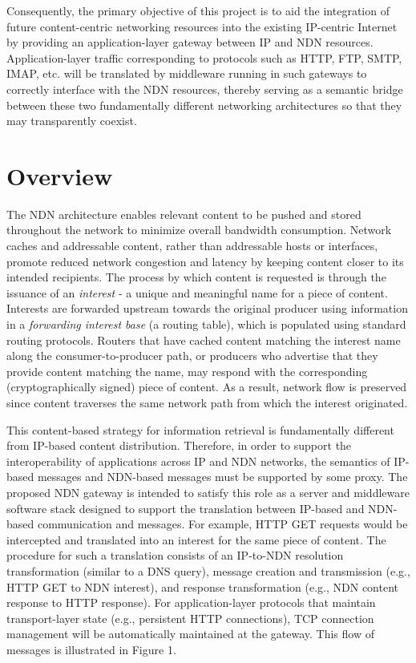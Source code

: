 \documentclass[10pt]{article}
\begin{document}
Consequently, the primary objective of this project is to aid the integration of future content-centric networking resources into the existing IP-centric Internet by providing an application-layer gateway between IP and NDN resources. Application-layer traffic corresponding to protocols such as HTTP, FTP, SMTP, IMAP, etc. will be translated by middleware running in such gateways to correctly interface with the NDN resources, thereby serving as a semantic bridge between these two fundamentally different networking architectures so that they may transparently coexist. 

\section{Overview}
The NDN architecture enables relevant content to be pushed and stored throughout the network to minimize overall bandwidth consumption. Network caches and addressable content, rather than addressable hosts or interfaces, promote reduced network congestion and latency by keeping content closer to its intended recipients. The process by which content is requested is through the issuance of an \emph{interest} - a unique and meaningful name for a piece of content. Interests are forwarded upstream towards the original producer using information in a \emph{forwarding interest base} (a routing table), which is populated using standard routing protocols. Routers that have cached content matching the interest name along the consumer-to-producer path, or producers who advertise that they provide content matching the name, may respond with the corresponding (cryptographically signed) piece of content. As a result, network flow is preserved since content traverses the same network path from which the interest originated. 

This content-based strategy for information retrieval is fundamentally different from IP-based content distribution. Therefore, in order to support the interoperability of applications across IP and NDN networks, the semantics of IP-based messages and NDN-based messages must be supported by some proxy. The proposed NDN gateway is intended to satisfy this role as a server and middleware software stack designed to support the translation between IP-based and NDN-based communication and messages. For example, HTTP GET requests would be intercepted and translated into an interest for the same piece of content. The procedure for such a translation consists of an IP-to-NDN resolution transformation (similar to a DNS query), message creation and transmission (e.g., HTTP GET to NDN interest), and response transformation (e.g., NDN content response to HTTP response). For application-layer protocols that maintain transport-layer state (e.g., persistent HTTP connections), TCP connection management will be automatically maintained at the gateway. This flow of messages is illustrated in Figure 1. 
\end{document}

